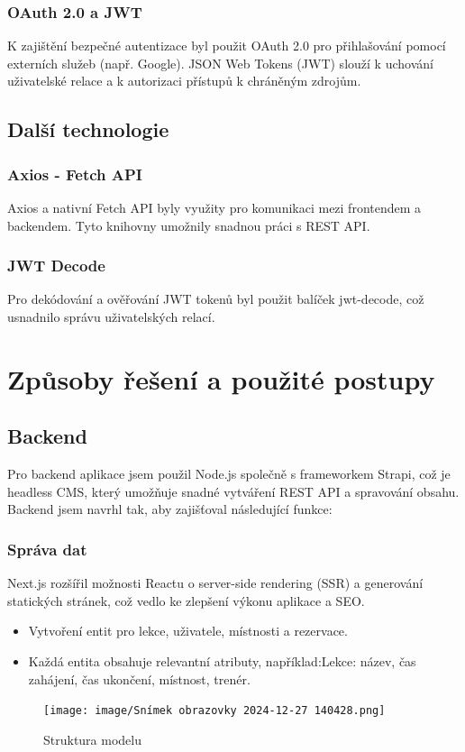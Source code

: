 \documentclass[12pt, a4paper,
openright
]{report}
\begin{document}
\subsection{OAuth 2.0 a JWT}
K zajištění bezpečné autentizace byl použit OAuth 2.0 pro přihlašování pomocí externích služeb (např. Google).
JSON Web Tokens (JWT) slouží k uchování uživatelské relace a k autorizaci přístupů k chráněným zdrojům.

\section{Další technologie} 
    
\subsection{Axios - Fetch API}
Axios a nativní Fetch API byly využity pro komunikaci mezi frontendem a backendem. Tyto knihovny umožnily snadnou práci s REST API.
\subsection{JWT Decode}
Pro dekódování a ověřování JWT tokenů byl použit balíček jwt-decode, což usnadnilo správu uživatelských relací.

    
\clearpage
	
	\chapter{Způsoby řešení a použité postupy}
	
	\section{Backend} 
    Pro backend aplikace jsem použil Node.js společně s frameworkem Strapi, což je headless CMS, který umožňuje snadné vytváření REST API a spravování obsahu. Backend jsem navrhl tak, aby zajišťoval následující funkce:
    
\subsection{Správa dat}
Next.js rozšířil možnosti Reactu o server-side rendering (SSR) a generování statických stránek, což vedlo ke zlepšení výkonu aplikace a SEO.
\begin{itemize}
	\item Vytvoření entit pro lekce, uživatele, místnosti a rezervace. 
	\item Každá entita obsahuje relevantní atributy, například:Lekce: název, čas zahájení, čas ukončení, místnost, trenér.
\end{itemize}
\begin{figure}
    \centering
    \texttt{[image: image/Snímek obrazovky 2024-12-27 140428.png]}
    \caption{Struktura modelu}
    \label{fig:enter-label}
\end{figure}
\clearpage
\end{document}
